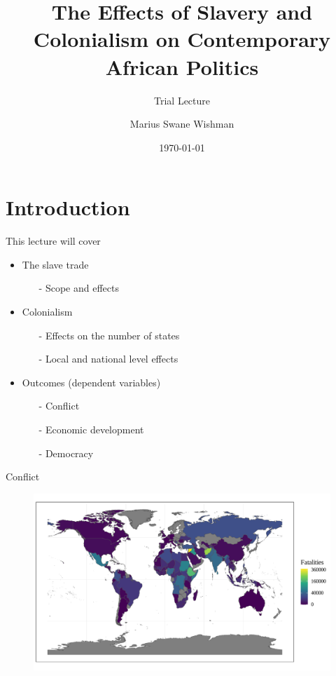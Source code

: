 \documentclass{beamer}
\title[Trial Lecture]{The Effects of Slavery and Colonialism on Contemporary
African Politics}
\subtitle{Trial Lecture}
\author[Wishman]{Marius Swane Wishman}
\date{\today}
\institute{NTNU}
\begin{document}
\begin{frame}[plain]
\titlepage 
\end{frame}

\section{Introduction} 

\begin{frame}{This lecture will cover}
\begin{itemize}
	\item The slave trade 
\begin{itemize}
	\item[-] Scope and effects 
\end{itemize}
	\item Colonialism 
		\begin{itemize}
			\item[-] Effects on the number of states 
			\item[-] Local and national level effects 
			
		\end{itemize}
	\item Outcomes (dependent variables)
		\begin{itemize}
			\item[-] Conflict
			\item[-] Economic development
			\item[-] Democracy
		\end{itemize}
\end{itemize}	
\end{frame}

\begin{frame}{Conflict}
\begin{figure}
	\includegraphics[width=\linewidth]{img/gedplot.pdf}
\end{figure}	
\end{frame}
\end{document}

